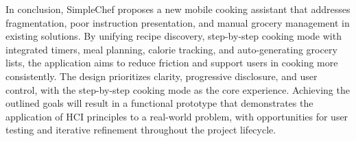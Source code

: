 In conclusion, SimpleChef proposes a new mobile cooking assistant that addresses fragmentation, poor instruction presentation, and manual grocery management in existing solutions. By unifying recipe discovery, step-by-step cooking mode with integrated timers, meal planning, calorie tracking, and auto-generating grocery lists, the application aims to reduce friction and support users in cooking more consistently. The design prioritizes clarity, progressive disclosure, and user control, with the step-by-step cooking mode as the core experience. Achieving the outlined goals will result in a functional prototype that demonstrates the application of HCI principles to a real-world problem, with opportunities for user testing and iterative refinement throughout the project lifecycle.
